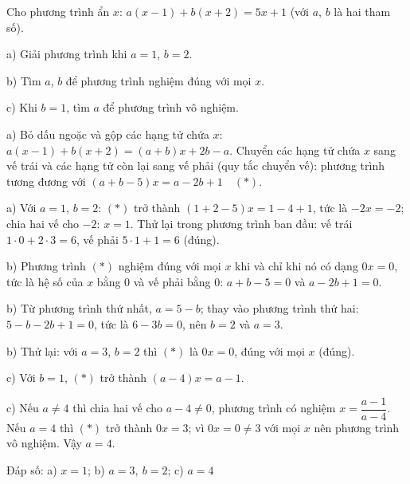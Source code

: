 \begin{problem}[8DS-PT1-048]
Cho phương trình ẩn $x$: $a(x - 1) + b(x + 2) = 5x + 1$ (với $a$, $b$ là hai tham số).

a) Giải phương trình khi $a = 1$, $b = 2$.

b) Tìm $a$, $b$ để phương trình nghiệm đúng với mọi $x$.

c) Khi $b = 1$, tìm $a$ để phương trình vô nghiệm.

\begin{solution}
a) Bỏ dấu ngoặc và gộp các hạng tử chứa $x$: $a(x - 1) + b(x + 2) = (a + b)x + 2b - a$. Chuyển các hạng tử chứa $x$ sang vế trái và các hạng tử còn lại sang vế phải (quy tắc chuyển vế): phương trình tương đương với $(a + b - 5)x = a - 2b + 1 \quad (*)$.

a) Với $a = 1$, $b = 2$: $(*)$ trở thành $(1 + 2 - 5)x = 1 - 4 + 1$, tức là $-2x = -2$; chia hai vế cho $-2$: $x = 1$. Thử lại trong phương trình ban đầu: vế trái $1 \cdot 0 + 2 \cdot 3 = 6$, vế phải $5 \cdot 1 + 1 = 6$ (đúng).

b) Phương trình $(*)$ nghiệm đúng với mọi $x$ khi và chỉ khi nó có dạng $0x = 0$, tức là hệ số của $x$ bằng $0$ và vế phải bằng $0$: $a + b - 5 = 0$ và $a - 2b + 1 = 0$.

b) Từ phương trình thứ nhất, $a = 5 - b$; thay vào phương trình thứ hai: $5 - b - 2b + 1 = 0$, tức là $6 - 3b = 0$, nên $b = 2$ và $a = 3$.

b) Thử lại: với $a = 3$, $b = 2$ thì $(*)$ là $0x = 0$, đúng với mọi $x$ (đúng).

c) Với $b = 1$, $(*)$ trở thành $(a - 4)x = a - 1$.

c) Nếu $a \neq 4$ thì chia hai vế cho $a - 4 \neq 0$, phương trình có nghiệm $x = \dfrac{a - 1}{a - 4}$. Nếu $a = 4$ thì $(*)$ trở thành $0x = 3$; vì $0x = 0 \neq 3$ với mọi $x$ nên phương trình vô nghiệm. Vậy $a = 4$.

Đáp số: a) $\boxed{x = 1}$; b) $\boxed{a = 3,\ b = 2}$; c) $\boxed{a = 4}$
\end{solution}
\end{problem}


